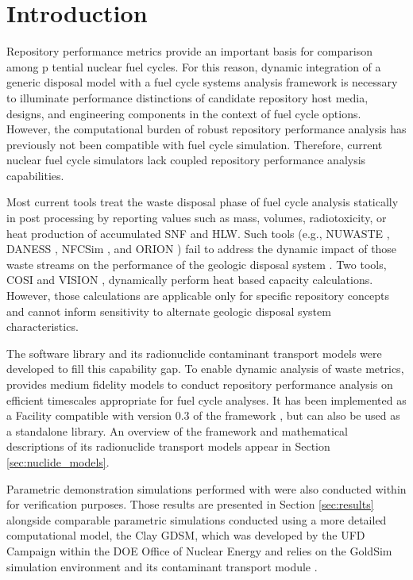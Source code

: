\section{Introduction}\label{sec:introduction}
Repository performance metrics provide an important basis for comparison among
p tential nuclear fuel cycles.
For this reason, dynamic integration of a generic disposal model with a fuel 
cycle systems analysis framework is necessary to illuminate performance 
distinctions of candidate repository host media, designs, and engineering 
components in the context of fuel cycle options. 
However, the computational
burden of robust repository performance analysis has previously not been
compatible with fuel cycle simulation.
Therefore, current nuclear fuel cycle simulators
lack coupled repository performance analysis capabilities.

Most current tools treat the waste disposal
phase of fuel cycle analysis statically in post processing by reporting
values such as mass, volumes, radiotoxicity, or heat production of accumulated
\gls{SNF} and \gls{HLW}. Such tools
(e.g.,
\gls{NUWASTE} \cite{abkowitz_nuclear_2010},
\gls{DANESS} \cite{van_den_durpel_daness:_2006},
\gls{NFCSim} \cite{schneider_nfcsim_2004}, and
ORION \cite{gregg_orion_2011})
fail to address the dynamic impact of those waste streams on the performance of the
geologic disposal system \cite{wilson_comparing_2011}.  Two tools, \gls{COSI}
\cite{boucher_international_2010} and \gls{VISION} \cite{yacout_vision_2006,
wilson_comparing_2011, radel_repository_2007, boucher_international_2010},
dynamically perform heat based capacity calculations.
However, those calculations are applicable only for specific
repository concepts and cannot inform sensitivity to alternate geologic disposal
system characteristics.

The \Cyder software library \cite{huff_cyder_2013} and its radionuclide
contaminant transport models were  developed to fill this capability gap.  To
enable dynamic analysis of waste metrics, \Cyder provides medium fidelity
models to conduct repository performance analysis on efficient timescales
appropriate for fuel cycle analyses. It has been implemented as a Facility
compatible with version 0.3 of the \Cyclus framework
\cite{wilson_cyclus:_2012}, but can also be used as a standalone library. An
overview of the \Cyder framework and mathematical descriptions of its
radionuclide transport models appear in Section \ref{sec:nuclide_models}.

Parametric demonstration simulations performed with \Cyder were also conducted
within \Cyclus for verification purposes. Those results are presented in
Section \ref{sec:results} alongside comparable parametric simulations conducted
using a more detailed computational model, the Clay \gls{GDSM}, which was
developed by the \gls{UFD} Campaign within the \gls{DOE} Office of Nuclear
Energy \cite{clayton_generic_2011} and relies on the GoldSim simulation
environment \cite{golder_associates_goldsim_2010-1} and its contaminant
transport module \cite{golder_associates_goldsim_2010-1}.

